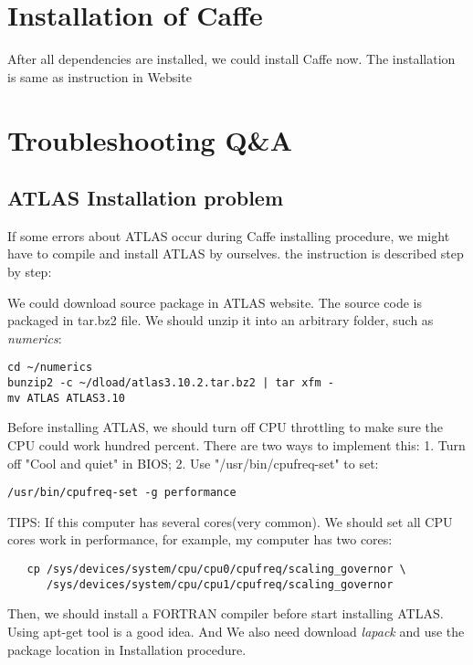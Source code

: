 \documentclass[a4paper, 11pt]{article}
\begin{document}
\section{Installation of Caffe}

After all dependencies are installed, we could install Caffe now. The installation is same as instruction in Website\cite{caffe1}


\section{Troubleshooting Q\&A}

\subsection{ATLAS Installation problem}

If some errors about ATLAS occur during Caffe installing procedure, we might have to compile and install ATLAS by ourselves. the instruction is described step by step:

We could download source package in ATLAS website.\cite{atlas1} The source code is packaged in tar.bz2 file. We should unzip it into an arbitrary folder, such as \emph{numerics}:
\begin{lstlisting}
cd ~/numerics
bunzip2 -c ~/dload/atlas3.10.2.tar.bz2 | tar xfm -
mv ATLAS ATLAS3.10
\end{lstlisting}

Before installing ATLAS, we should turn off CPU throttling to make sure the CPU could work hundred percent. There are two ways to implement this: 1. Turn off "Cool and quiet" in BIOS; 2. Use "/usr/bin/cpufreq-set" to set:

\begin{lstlisting}
/usr/bin/cpufreq-set -g performance
\end{lstlisting}

TIPS: If this computer has several cores(very common). We should set all CPU cores work in performance, for example,  my computer has two cores:

\begin{lstlisting}
   cp /sys/devices/system/cpu/cpu0/cpufreq/scaling_governor \
      /sys/devices/system/cpu/cpu1/cpufreq/scaling_governor
\end{lstlisting}

Then, we should install a FORTRAN compiler before start installing ATLAS. Using apt-get tool is a good idea. And We also need download \emph{lapack} and use the package location in Installation procedure.
\end{document}
